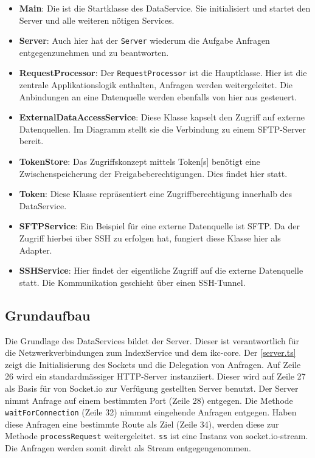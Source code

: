 \begin{itemize}
    \item \textbf{Main}: Die ist die Startklasse des DataService. Sie initialisiert und startet den Server und alle weiteren nötigen Services.
    \item \textbf{Server}: Auch hier hat der \texttt{Server} wiederum die Aufgabe Anfragen entgegenzunehmen und zu beantworten.
    \item \textbf{RequestProcessor}: Der \texttt{RequestProcessor} ist die Hauptklasse. Hier ist die zentrale Applikationslogik enthalten, Anfragen werden weitergeleitet. Die Anbindungen an eine Datenquelle werden ebenfalls von hier aus gesteuert.
    \item \textbf{ExternalDataAccessService}: Diese Klasse kapselt den Zugriff auf externe Datenquellen. Im Diagramm stellt sie die Verbindung zu einem \gls{SFTP}-Server bereit.
    \item \textbf{TokenStore}: Das Zugriffskonzept mittels \gls{Token}[s] benötigt eine Zwischenspeicherung der Freigabeberechtigungen. Dies findet hier statt. 
    \item \textbf{Token}: Diese Klasse repräsentiert eine Zugriffberechtigung innerhalb des DataService.
    \item \textbf{SFTPService}: Ein Beispiel für eine externe Datenquelle ist \gls{SFTP}. Da der Zugriff hierbei über \gls{SSH} zu erfolgen hat, fungiert diese Klasse hier als Adapter.
    \item \textbf{SSHService}: Hier findet der eigentliche Zugriff auf die externe Datenquelle statt. Die Kommunikation geschieht über einen \gls{SSH}-Tunnel.
\end{itemize}

\subsection{Grundaufbau}

Die Grundlage des DataServices bildet der Server. Dieser ist verantwortlich für die Netzwerkverbindungen zum IndexService und dem \gls{ikc-core}. Der \autoref{server.ts} zeigt die Initialisierung des Sockets und die Delegation von Anfragen. Auf Zeile 26 wird ein stan\-dard\-mäs\-siger HTTP-Server instanziiert. Dieser wird auf Zeile 27 als Basis für von Socket.io zur Verfügung gestellten Server benutzt. Der Server nimmt Anfrage auf einem bestimmten Port (Zeile 28) entgegen. Die Methode \verb|waitForConnection| (Zeile 32) nimmmt eingehende Anfragen entgegen. Haben diese Anfragen eine bestimmte Route als Ziel (Zeile 34), werden diese zur Methode \texttt{pro\-cess\-Re\-quest} weitergeleitet. \verb|ss| ist eine Instanz von socket.io-stream. Die Anfragen werden somit direkt als \gls{Stream} entgegengenommen.

